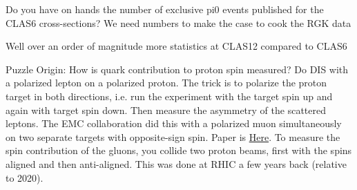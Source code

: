 Do you have on hands the number of exclusive pi0 events published for the CLAS6 cross-sections?
We need numbers to make the case to cook the RGK data

Well over an order of magnitude more statistics at CLAS12 compared to CLAS6


    Puzzle Origin: How is quark contribution to proton spin measured?
        Do DIS with a polarized lepton on a polarized proton. The trick is to polarize the proton target in both directions, i.e. run the experiment with the target spin up and again with target spin down. Then measure the asymmetry of the scattered leptons. The EMC collaboration did this with a polarized muon simultaneously on two separate targets with opposite-sign spin. Paper is \href{https://www-sciencedirect-com.libproxy.mit.edu/science/article/pii/0550321389900898?via\%3Dihub}{Here}. To measure the spin contribution of the gluons, you collide two proton beams, first with the spins aligned and then anti-aligned. This was done at RHIC a few years back (relative to 2020). 



